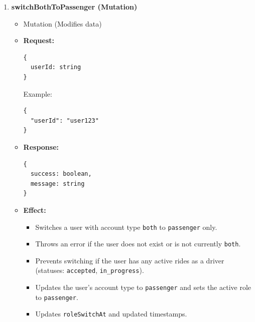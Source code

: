 \documentclass[a4paper,12pt]{article}
\begin{document}
\begin{enumerate}
\item \textbf{switchBothToPassenger (Mutation)}
    \begin{itemize}
      \item Mutation (Modifies data)
      \item \textbf{Request:}
      \begin{verbatim}
{
  userId: string
}
      \end{verbatim}
      Example:
      \begin{verbatim}
{
  "userId": "user123"
}
      \end{verbatim}
      \item \textbf{Response:}
      \begin{verbatim}
{
  success: boolean,
  message: string
}
      \end{verbatim}
      \item \textbf{Effect:}
      \begin{itemize}
          \item Switches a user with account type \texttt{both} to \texttt{passenger} only.
          \item Throws an error if the user does not exist or is not currently \texttt{both}.
          \item Prevents switching if the user has any active rides as a driver (statuses: \texttt{accepted}, \texttt{in\_progress}).
          \item Updates the user's account type to \texttt{passenger} and sets the active role to \texttt{passenger}.
          \item Updates \texttt{roleSwitchAt} and updated timestamps.
        \end{itemize}
    \end{itemize}


\end{enumerate}
\end{document}
